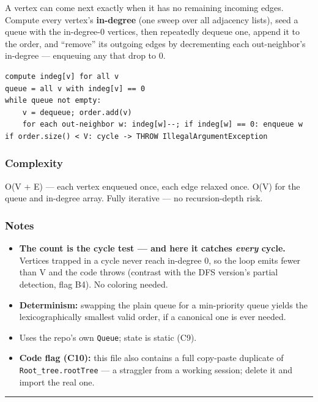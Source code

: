\documentclass[
  10pt,
  letterpaper,
  onecolumn]{article}
\providecommand{\tightlist}{%
  \setlength{\itemsep}{0pt}\setlength{\parskip}{0pt}}
\begin{document}
A vertex can come next exactly when it has no remaining incoming edges.
Compute every vertex's \textbf{in-degree} (one sweep over all adjacency
lists), seed a queue with the in-degree-0 vertices, then repeatedly
dequeue one, append it to the order, and ``remove'' its outgoing edges
by decrementing each out-neighbor's in-degree --- enqueuing any that
drop to 0.

\begin{verbatim}
compute indeg[v] for all v
queue = all v with indeg[v] == 0
while queue not empty:
    v = dequeue; order.add(v)
    for each out-neighbor w: indeg[w]--; if indeg[w] == 0: enqueue w
if order.size() < V: cycle -> THROW IllegalArgumentException
\end{verbatim}

\hypertarget{complexity-15}{%
\subsubsection{Complexity}\label{complexity-15}}

O(V + E) --- each vertex enqueued once, each edge relaxed once. O(V) for
the queue and in-degree array. Fully iterative --- no recursion-depth
risk.

\hypertarget{notes-14}{%
\subsubsection{Notes}\label{notes-14}}

\begin{itemize}
\tightlist
\item
  \textbf{The count is the cycle test --- and here it catches
  \emph{every} cycle.} Vertices trapped in a cycle never reach in-degree
  0, so the loop emits fewer than V and the code throws (contrast with
  the DFS version's partial detection, flag B4). No coloring needed.
\item
  \textbf{Determinism:} swapping the plain queue for a min-priority
  queue yields the lexicographically smallest valid order, if a
  canonical one is ever needed.
\item
  Uses the repo's own \texttt{Queue}; state is static (C9).
\item
  \textbf{Code flag (C10):} this file also contains a full copy-paste
  duplicate of \texttt{Root\_tree.rootTree} --- a straggler from a
  working session; delete it and import the real one.
\end{itemize}

\begin{center}\rule{0.5\linewidth}{0.5pt}\end{center}
\end{document}

